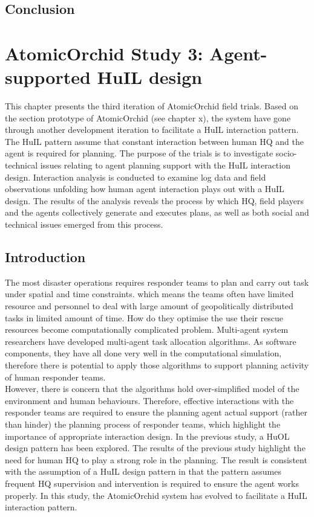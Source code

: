 \section{Conclusion}

\chapter{AtomicOrchid Study 3: Agent-supported HuIL design}\label{ch:studythree} 
This chapter presents the third iteration of AtomicOrchid field trials. Based on the section prototype of AtomicOrchid (see chapter x), the system have gone through another development iteration to facilitate a HuIL interaction pattern. The HuIL pattern assume that constant interaction between human HQ and the  agent is required for planning. The purpose of the trials is to investigate socio-technical issues relating to agent planning support with the HuIL interaction design. Interaction analysis is conducted to examine log data and field observations unfolding how human agent interaction plays out with a HuIL design. The results of the analysis reveals the process by which HQ, field players and the agents collectively generate and executes plans, as well as  both social and technical issues emerged from this process.  \\


\section{Introduction}
The most disaster operations requires responder teams to plan and carry out task under spatial and time constraints. which means the teams often have limited resource and personnel to deal with large amount of geopolitically distributed tasks in limited amount of time. How do they optimise the use their rescue resources become computationally complicated problem. Multi-agent system researchers have developed multi-agent task allocation algorithms. As software components, they have all done very well in the computational simulation, therefore there is potential to apply those algorithms to support planning activity of human responder teams. \\

However, there is concern that the algorithms hold over-simplified model of the environment and human behaviours. Therefore, effective interactions with the responder teams are required to ensure the planning agent actual support (rather than hinder) the planning process of responder teams, which highlight the importance of appropriate interaction design. In the previous study, a HuOL design pattern has been explored. The results of the previous study highlight the need for human HQ to play a strong role in the planning. The result is consistent with the assumption of a HuIL design pattern in that the pattern assumes frequent HQ supervision and intervention is required to ensure the agent works properly. In this study, the AtomicOrchid system has evolved to facilitate a HuIL interaction pattern.\\


